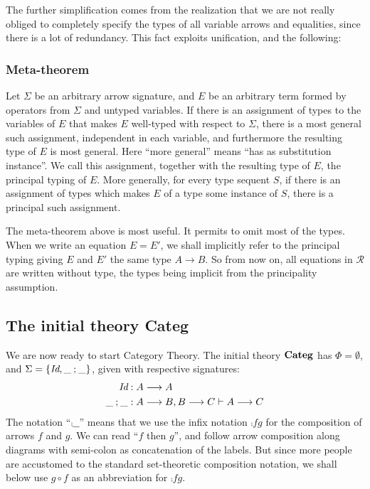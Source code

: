 The further simplification comes from the realization that we are not really obliged to completely specify the types of all variable arrows and equalities, since there is a lot of redundancy. This fact exploits unification, and the following:

\subsubsection*{Meta-theorem}

Let $\Sigma$ be an arbitrary arrow signature, and $E$ be an arbitrary term formed by operators from $\Sigma$ and untyped variables. If there is an assignment of types to the variables of $E$ that makes $E$ well-typed with respect to $\Sigma$, there is a most general such assignment, independent in each variable, and furthermore the resulting type of $E$ is most general. Here ``more general'' means ``has as substitution instance''. We call this assignment, together with the resulting type of $E$, the principal typing of $E$. More generally, for every type sequent $S$, if there is an assignment of types which makes $E$ of a type some instance of $S$, there is a principal such assignment.

The meta-theorem above is most useful. It permits to omit most of the types. When we write
an equation $E= E'$, we shall implicitly refer to the principal typing giving $E$ and $E'$ 
the same type $A\to B$. So from now on, all equations in $\mathcal R$ 
are written without type, the types being implicit
from the principality assumption.

\subsection{The initial theory Categ}

We are now ready to start Category Theory. The initial theory ${\mathbf {Categ}}$ has $\Phi = \emptyset$,
and $\Sigma = \{\text{\it Id},\_ \mathbin{;} \_ \}$, given with respective signatures:
\begin{align*}
\text{\it Id} &: A \longrightarrow A\\
\_ \mathbin{;} \_&: A \longrightarrow B, B \longrightarrow C \vdash A \longrightarrow C
\end{align*}
The notation ``$\comp{\_}{\_}$'' means that we use the infix notation $\comp{f}{g}$
for the composition of arrows $f$ and $g$. We can read ``$\!f$ then $g$'',
and follow arrow composition along diagrams with semi-colon as
concatenation of the labels. But since more people are accustomed to the standard set-theoretic
composition notation, we shall below use $g\circ f$ as an abbreviation for $\comp{f}{g}$.

